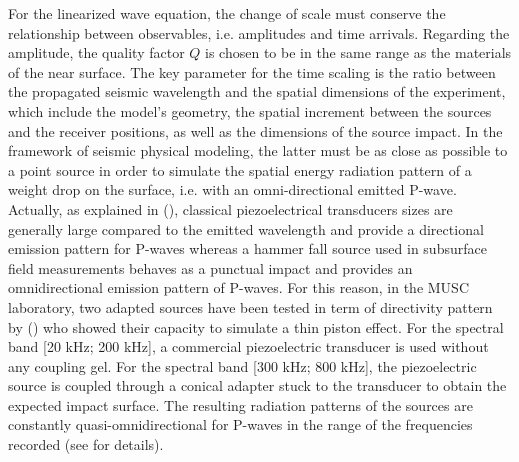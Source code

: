 \documentclass[extra,mreferee]{gji}
\begin{document}
For the linearized wave equation, the change of scale must conserve the relationship between observables, i.e. amplitudes and time arrivals. Regarding the amplitude, the quality factor $Q$ is chosen to be in the same range as the materials of the near surface. The key parameter for the time scaling is the ratio between the propagated seismic wavelength and the spatial dimensions of the experiment, which include the model’s geometry, the spatial increment between the sources and the receiver positions, as well as the dimensions of the source impact. In the framework of seismic physical modeling, the latter must be as close as possible to a point source in order to simulate the spatial energy radiation pattern of a weight drop on the surface, i.e. with an omni-directional emitted P-wave. Actually, as explained in (\cite{bretaudeau2011ssm}), classical piezoelectrical transducers sizes are generally large compared to the emitted wavelength and provide a directional emission pattern for P-waves whereas a hammer fall source used in subsurface field measurements behaves as a punctual impact and provides an omnidirectional emission pattern of P-waves. For this reason, in the MUSC laboratory, two adapted sources have been tested in term of directivity pattern by (\cite{bretaudeau2011ssm})  who showed their capacity to simulate a thin piston effect. For the spectral band [20 kHz; 200 kHz], a commercial piezoelectric transducer is used without any coupling gel. For the spectral band [300 kHz; 800 kHz], the piezoelectric source is coupled through a conical adapter stuck to the transducer to obtain the expected impact surface. The resulting radiation patterns of the sources are constantly quasi-omnidirectional for P-waves in the range of the frequencies recorded (see \cite{bretaudeau2011ssm} for details). 
\end{document}
